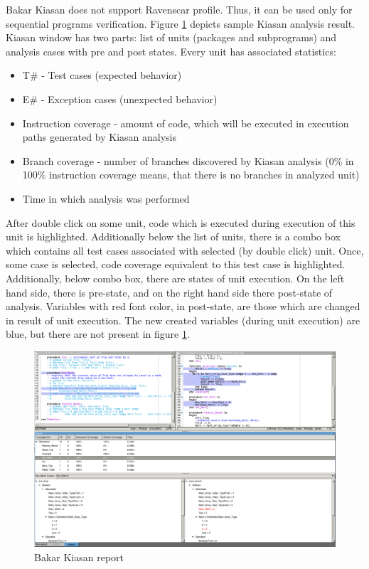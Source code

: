 Bakar Kiasan does not support Ravenscar profile. Thus, it can be used only for sequential programs verification. Figure \ref{figure:kiasan-sample} depicts sample Kiasan analysis result. Kiasan window has two parts: list of units (packages and subprograms) and analysis cases with pre and post states. Every unit has associated statistics:
\begin{itemize}
	\item T\# - Test cases (expected behavior)
	\item E\# - Exception cases (unexpected behavior)
	\item Instruction coverage - amount of code, which will be executed in execution paths generated by Kiasan analysis
	\item Branch coverage - number of branches discovered by Kiasan analysis (0\% in 100\% instruction coverage means, that there is no branches in analyzed unit)
	\item Time in which analysis was performed
\end{itemize}

After double click on some unit, code which is executed during execution of this unit is highlighted. Additionally below the list of units, there is a combo box which contains all test cases associated with selected (by double click) unit. Once, some case is selected, code coverage equivalent to this test case is highlighted. Additionally, below combo box, there are states of unit execution. On the left hand side, there is pre-state, and on the right hand side there post-state of analysis. Variables with red font color, in post-state, are those which are changed in result of unit execution. The new created variables (during unit execution) are blue, but there are not present in figure \ref{figure:kiasan-sample}.

\begin{figure}[ht]%
    \begin{center}
    	\includegraphics[width=1\textwidth]{figures/kiasan-sample.png}    	
    \end{center}
    \caption{Bakar Kiasan report}
    \label{figure:kiasan-sample}
\end{figure}

